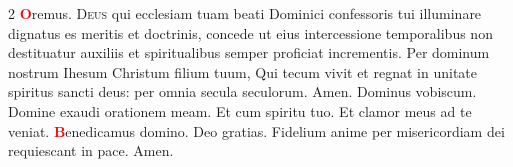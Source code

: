 \begin{multicols}{2}
\newline \textcolor{Red}{\bfseries O}remus. 
\lettrine[lines=2]{\zallmancaps \color{Blue} D}{eus} qui ecclesiam tuam beati Dominici confessoris tui illuminare dignatus es meritis et doctrinis, concede ut eius intercessione temporalibus non destituatur auxiliis et spiritualibus semper proficiat incrementis. Per dominum nostrum Ihesum Christum filium tuum, Qui tecum vivit et regnat in unitate spiritus sancti deus: per omnia secula seculorum. \R Amen.
 Dominus vobiscum.  Domine exaudi orationem meam.
\newline \R Et cum spiritu tuo.  Et clamor meus ad te veniat.
\newline \textcolor{Red}{\bfseries B}enedicamus domino. \R Deo gratias.
\newline {}
\newline Fidelium anime per misericordiam dei requiescant in pace. \R Amen.
\newline {}

\vspace{+1em}
\newline {}

\end{multicols}







